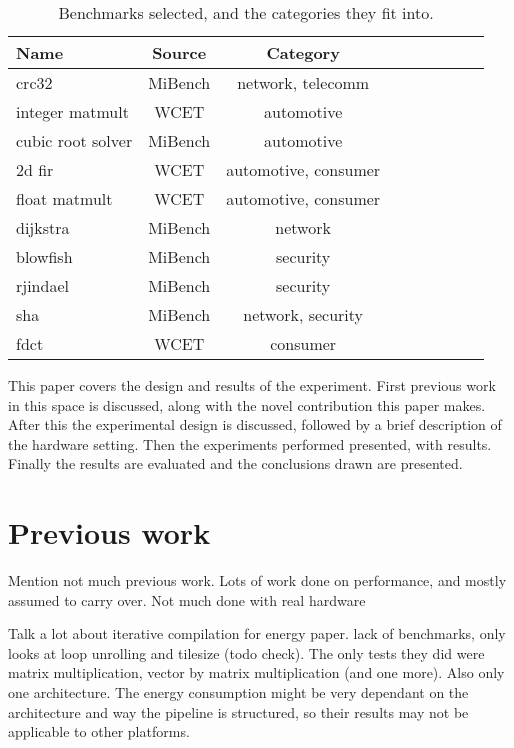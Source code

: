 \documentclass[twocolumn]{article}
\begin{document}
\begin{table}
\centering
	\begin{tabular}{l c c c c c c c l}
	\textbf{Name}			& \textbf{Source} 	& \textbf{Category} \\
	\hline
	crc32					& MiBench 	& network, telecomm	\\
	integer matmult			& WCET	 	& automotive	\\
	cubic root solver		& MiBench 	& automotive	\\
	2d fir					& WCET 		& automotive, consumer	\\
	float matmult			& WCET 		& automotive, consumer	\\
	dijkstra				& MiBench 	& network	\\
	blowfish				& MiBench 	& security	\\
	rjindael				& MiBench 	& security	\\
	sha						& MiBench 	& network, security	\\
	fdct					& WCET 		& consumer	\\
	\end{tabular}
\caption{Benchmarks selected, and the categories they fit into.}
\label{Table:Benchmarks}
\end{table}



This paper covers the design and results of the experiment. First previous work in this space is discussed, along with the novel contribution this paper makes. After this the experimental design is discussed, followed by a brief description of the hardware setting. Then the experiments performed presented, with results. Finally the results are evaluated and the conclusions drawn are presented.

\section*{Previous work}

Mention not much previous work. Lots of work done on performance, and mostly assumed to carry over. Not much done with real hardware

Talk a lot about iterative compilation for energy paper. lack of benchmarks, only looks at loop unrolling and tilesize (todo check). The only tests they did were matrix multiplication, vector by matrix multiplication (and one more). Also only one architecture. The energy consumption might be very dependant on the architecture and way the pipeline is structured, so their results may not be applicable to other platforms.
\end{document}
